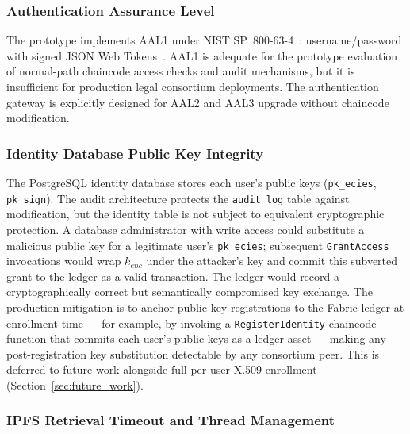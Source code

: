 \documentclass{ieeeaccess}
\begin{document}
\subsubsection{Authentication Assurance Level}
The prototype implements AAL1 under NIST SP~800-63-4~\cite{nist800634}:
username/password with signed JSON Web Tokens~\cite{rfc7519jwt}.
AAL1 is adequate for the prototype evaluation of normal-path
chaincode access checks and audit mechanisms, but it is insufficient
for production legal consortium deployments. The authentication gateway is explicitly designed for
AAL2 and AAL3 upgrade without chaincode modification.

\subsubsection{Identity Database Public Key Integrity}

The PostgreSQL identity database stores each user's public keys (\texttt{pk\_ecies}, \texttt{pk\_sign}). The audit architecture protects the \texttt{audit\_log} table against modification, but the identity table is not subject to equivalent cryptographic protection. A database administrator with write access could substitute a malicious public key for a legitimate user's \texttt{pk\_ecies}; subsequent \texttt{GrantAccess} invocations would wrap $k_{enc}$ under the attacker's key and commit this subverted grant to the ledger as a valid transaction. The ledger would record a cryptographically correct but semantically compromised key exchange. The production mitigation is to anchor public key registrations to the Fabric ledger at enrollment time --- for example, by invoking a \texttt{RegisterIdentity} chaincode function that commits each user's public keys as a ledger asset --- making any post-registration key substitution detectable by any consortium peer. This is deferred to future work alongside full per-user X.509 enrollment (Section~\ref{sec:future_work}).

\subsubsection{IPFS Retrieval Timeout and Thread Management}
\end{document}
